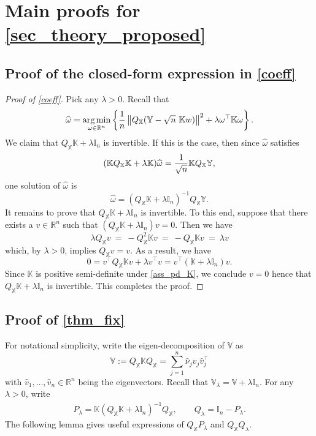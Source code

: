 \documentclass[11pt,twoside]{article}
\DeclareMathOperator*{\argmin}{arg\,min}
\def\VV{\mathbb{V}}
\def\KK{\mathbb{K}}
\def\II{\mathbb{I}}
\def\YY{\mathbb{Y}}
\def\XX{\mathbb{X}}
\def\RR{\mathbb{R}}
\def\wh{\widehat}
\def\T{\top}
\def\l{\left}
\def\r{\right}
\begin{document}
\section{Main proofs for \cref{sec_theory_proposed}}\label{app_sec_proof_LKRR}

\subsection{Proof of the closed-form expression in \texorpdfstring{\cref{coeff}}{\texttwoinferior}}\label{app_pf_sec_2}
\begin{proof}[Proof of  \eqref{coeff}] 
Pick any $\lambda >0$.
Recall that
    \[
        \wh \omega =  \argmin_{\omega \in \RR^n }\l\{
            {1\over n}\l \|    Q_{\XX} (\YY - \sqrt{n} ~ \KK w ) \r \|^2 + \lambda \omega^\T \KK \omega
        \r\}.
    \]
    We claim that 
    $Q_{\XX} \KK+ \lambda \II_n$ is invertible. If this is the case, then  
since $\wh\omega$ satisfies 
    \[
        (\KK Q_{\XX} \KK + \lambda \KK) \wh\omega = {1\over \sqrt{n}} \KK Q_{\XX} \YY ,
    \]
 one solution of  $\wh\omega$ is 
\[
\wh \omega =  \l( Q_{\XX} \KK+ \lambda \II_n\r)^{-1} Q_{\XX} \YY.
\]
It remains to prove that  $Q_{\XX} \KK+ \lambda \II_n$ is invertible. To this end, suppose that there exists a $v\in \RR^n$ such that
$
( Q_{\XX} \KK + \lambda \II_n ) v  = 0 .
$
Then we have 
\[
\lambda Q_{\XX} v ~ = ~ -   Q_{\XX}^2 \KK  v ~ = ~  -   Q_{\XX} \KK  v ~ = ~ \lambda v 
\]
which, by $\lambda >0$, implies $Q_{\XX} v = v$. As a result, we have 
\[
 0= v^\T  Q_{\XX} \KK v+ \lambda v^\T v   
=  v^\T (\KK + \lambda \II_n ) v.
\]
Since $\KK$ is positive semi-definite under \cref{ass_pd_K}, we conclude  $v=0$ hence that  $Q_{\XX} \KK+ \lambda \II_n$ is  invertible.  This completes the proof.
\end{proof}

    
\subsection{Proof of \texorpdfstring{\cref{thm_fix}}{\texttwoinferior}}\label{app_proof_thm_fix}
For notational simplicity, write the eigen-decomposition of $\VV$ as 
\begin{equation}\label{V_eigen}
    \VV := Q_{\XX}\KK Q_{\XX} = \sum_{j=1}^n   \wh \nu_j  \wh v_j  \wh v_j^\T
\end{equation} 
with $\wh v_1,\ldots,\wh v_n \in \RR^n$ being the eigenvectors. Recall that   $\VV_\lambda = \VV + \lambda \II_n.$ 
For any $\lambda >0$, write
\begin{align} \label{def_P_lambda}
    P_\lambda = \KK  ( Q_{\XX} \KK +\lambda \II_n )^{-1}  Q_{\XX}, \qquad Q_{\lambda} =\II_n -P_\lambda.
\end{align}
The following lemma gives useful expressions of $Q_{\XX} P_\lambda$ and $Q_{\XX} Q_{\lambda}$.  
\end{document}
